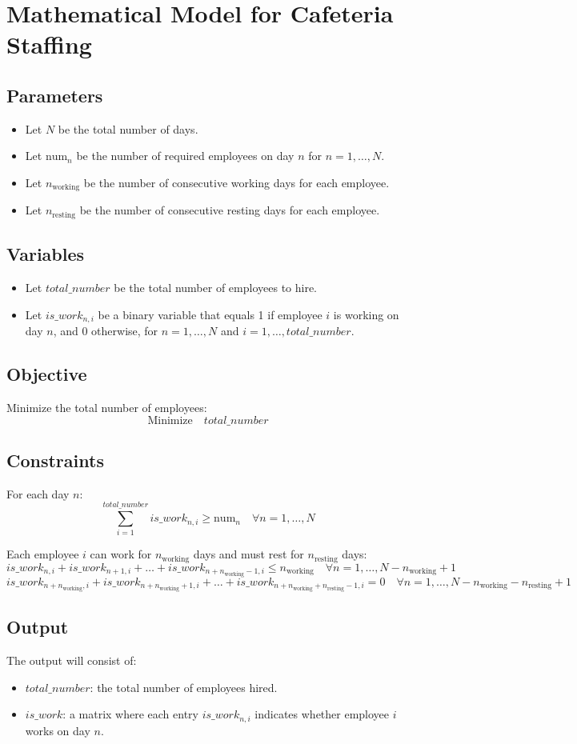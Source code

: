 \documentclass{article}
\begin{document}
\section*{Mathematical Model for Cafeteria Staffing}

\subsection*{Parameters}
\begin{itemize}
    \item Let \( N \) be the total number of days.
    \item Let \( \text{num}_{n} \) be the number of required employees on day \( n \) for \( n = 1, \ldots, N \).
    \item Let \( n_{\text{working}} \) be the number of consecutive working days for each employee.
    \item Let \( n_{\text{resting}} \) be the number of consecutive resting days for each employee.
\end{itemize}

\subsection*{Variables}
\begin{itemize}
    \item Let \( total\_number \) be the total number of employees to hire.
    \item Let \( is\_work_{n,i} \) be a binary variable that equals 1 if employee \( i \) is working on day \( n \), and 0 otherwise, for \( n = 1, \ldots, N \) and \( i = 1, \ldots, total\_number \).
\end{itemize}

\subsection*{Objective}
Minimize the total number of employees:
\[
\text{Minimize} \quad total\_number
\]

\subsection*{Constraints}
For each day \( n \):
\[
\sum_{i=1}^{total\_number} is\_work_{n,i} \geq \text{num}_{n} \quad \forall n = 1, \ldots, N
\]

Each employee \( i \) can work for \( n_{\text{working}} \) days and must rest for \( n_{\text{resting}} \) days:
\[
is\_work_{n,i} + is\_work_{n+1,i} + \ldots + is\_work_{n+n_{\text{working}}-1,i} \leq n_{\text{working}} \quad \forall n = 1, \ldots, N - n_{\text{working}} + 1
\]
\[
is\_work_{n+n_{\text{working}},i} + is\_work_{n+n_{\text{working}}+1,i} + \ldots + is\_work_{n+n_{\text{working}}+n_{\text{resting}}-1,i} = 0 \quad \forall n = 1, \ldots, N - n_{\text{working}} - n_{\text{resting}} + 1
\]

\subsection*{Output}
The output will consist of:
\begin{itemize}
    \item \( total\_number \): the total number of employees hired.
    \item \( is\_work \): a matrix where each entry \( is\_work_{n,i} \) indicates whether employee \( i \) works on day \( n \).
\end{itemize}
\end{document}
